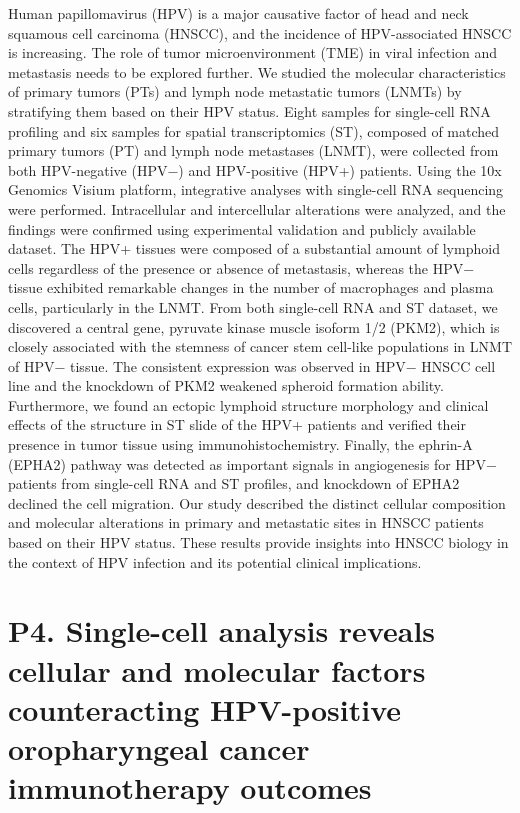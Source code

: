 \noindent
Human papillomavirus (HPV) is a major causative factor of head and neck squamous cell carcinoma (HNSCC), and the incidence of HPV-associated HNSCC is increasing. The role of tumor microenvironment (TME) in viral infection and metastasis needs to be explored further. We studied the molecular characteristics of primary tumors (PTs) and lymph node metastatic tumors (LNMTs) by stratifying them based on their HPV status. Eight samples for single-cell RNA profiling and six samples for spatial transcriptomics (ST), composed of matched primary tumors (PT) and lymph node metastases (LNMT), were collected from both HPV-negative (HPV−) and HPV-positive (HPV+) patients. Using the 10x Genomics Visium platform, integrative analyses with single-cell RNA sequencing were performed. Intracellular and intercellular alterations were analyzed, and the findings were confirmed using experimental validation and publicly available dataset. The HPV+ tissues were composed of a substantial amount of lymphoid cells regardless of the presence or absence of metastasis, whereas the HPV− tissue exhibited remarkable changes in the number of macrophages and plasma cells, particularly in the LNMT. From both single-cell RNA and ST dataset, we discovered a central gene, pyruvate kinase muscle isoform 1/2 (PKM2), which is closely associated with the stemness of cancer stem cell-like populations in LNMT of HPV− tissue. The consistent expression was observed in HPV− HNSCC cell line and the knockdown of PKM2 weakened spheroid formation ability. Furthermore, we found an ectopic lymphoid structure morphology and clinical effects of the structure in ST slide of the HPV+ patients and verified their presence in tumor tissue using immunohistochemistry. Finally, the ephrin-A (EPHA2) pathway was detected as important signals in angiogenesis for HPV− patients from single-cell RNA and ST profiles, and knockdown of EPHA2 declined the cell migration. Our study described the distinct cellular composition and molecular alterations in primary and metastatic sites in HNSCC patients based on their HPV status. These results provide insights into HNSCC biology in the context of HPV infection and its potential clinical implications.
\newpage

\section*{P4. Single-cell analysis reveals cellular and molecular factors counteracting HPV-positive oropharyngeal cancer immunotherapy outcomes}


